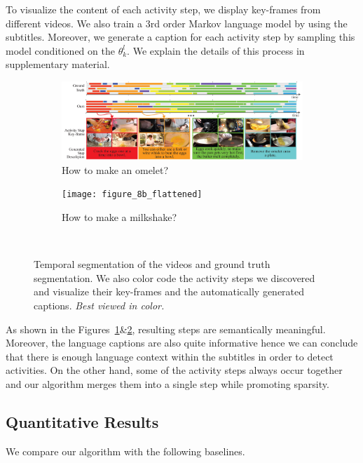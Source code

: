 To visualize the content of each activity step, we display key-frames from different videos. We also train a 3rd order Markov language model\cite{languageModel} by using the subtitles. Moreover, we generate a caption for each activity step by sampling this model conditioned on the $\theta^l_k$. We explain the details of this process in supplementary material.

\begin{figure}[ht]
  \begin{subfigure}[b]{\textwidth}
    \includegraphics[width=\textwidth]{figure_8a_flattened}
    \vspace{-5mm}
    \caption{How to make an omelet?}
    \vspace{-1mm}
    \label{recipe:ommelette}
  \end{subfigure}

  \begin{subfigure}[b]{\textwidth}
    \texttt{[image: figure\_8b\_flattened]}
    \caption{How to make a milkshake?}
    \vspace{-3mm}
    \label{recipe:milkshake}
  \end{subfigure}~
\caption{Temporal segmentation of the videos and ground truth segmentation. We also color code the activity steps we discovered and visualize their key-frames and the automatically generated captions. \emph{Best viewed in color.}}
\label{recipe:overall}
\vspace{-3mm}
\end{figure}

As shown in the Figures~\ref{recipe:ommelette}\&\ref{recipe:milkshake}, resulting steps are semantically meaningful. Moreover, the language captions are also quite informative hence we can conclude that there is enough language context within the subtitles in order to detect activities. On the other hand, some of the activity steps always occur together and our algorithm merges them into a single step while promoting sparsity.

\subsection{Quantitative Results}
We compare our algorithm with the following baselines.


